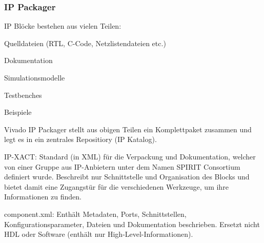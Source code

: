 \subsubsection{IP Packager}
\begin{compactitem}
    \item IP Blöcke bestehen aus vielen Teilen: 
    \begin{compactitem}
        \item Quelldateien (RTL, C-Code, Netzlistendateien etc.) 
        \item Dokumentation
        \item Simulationsmodelle
        \item Testbenches
        \item Beispiele
    \end{compactitem} 
    \item Vivado IP Packager stellt aus obigen Teilen ein Komplettpaket zusammen und legt es in ein zentrales Repositiory (IP Katalog).
    \item IP-XACT: Standard (in XML) für die Verpackung und Dokumentation, welcher von einer Gruppe aus IP-Anbietern unter dem Namen SPIRIT Consortium definiert wurde. Beschreibt nur Schnittstelle und Organisation des Blocks und bietet damit eine Zugangstür für die verschiedenen Werkzeuge, um ihre Informationen zu finden.
    \item component.xml: Enthält Metadaten, Ports, Schnittstellen, Konfigurationsparameter, Dateien und Dokumentation beschrieben. Ersetzt nicht HDL oder Software (enthält nur High-Level-Informationen).  
\end{compactitem}
